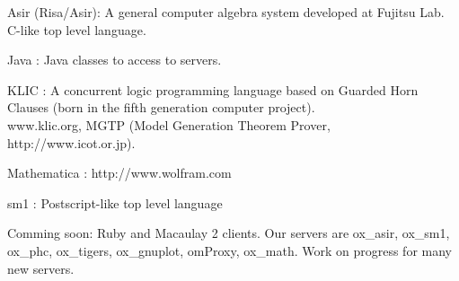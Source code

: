 \documentclass{slides}
\begin{document}

\noindent
{\color{red} Asir} (Risa/Asir):
A general computer algebra system developed at Fujitsu Lab.
C-like top level language.

\noindent
{\color{red} Java} :
Java classes to access to servers.

\noindent
{\color{red} KLIC } :
  A {\color{green} concurrent logic} programming language based
on Guarded Horn Clauses (born in the fifth generation computer project). \\
 {\color{green} www.klic.org}, 
 {\color{red} MGTP} (Model Generation Theorem Prover, http://www.icot.or.jp).

\noindent
{\color{red} Mathematica}  : http://www.wolfram.com

\noindent
{\color{red} sm1} :
Postscript-like top level language

\bigbreak
\noindent
Comming soon: Ruby and Macaulay 2 clients.
Our servers are ox\_asir, ox\_sm1, ox\_phc, ox\_tigers, ox\_gnuplot,
omProxy, ox\_math. Work on progress for many new servers.

\medbreak
\noindent
\rightline{\footnotesize {\color{red} {\tt http://www.openxm.org} }}
\end{document}
